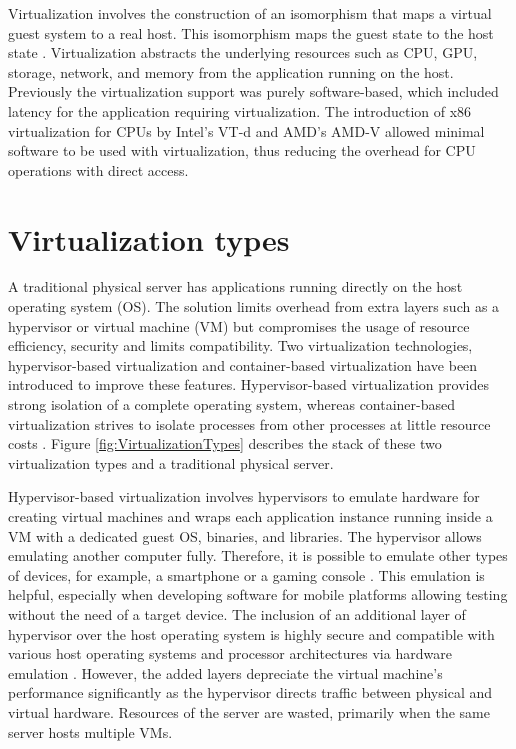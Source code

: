 Virtualization involves the construction of an isomorphism that maps a virtual guest system to a real host. This isomorphism maps the guest state to the host state \cite{Xing2012}. Virtualization abstracts the underlying resources such as CPU, GPU, storage, network, and memory from the application running on the host. Previously the virtualization support was purely software-based, which included latency for the application requiring virtualization. The introduction of x86 virtualization for CPUs by Intel's VT-d and AMD's AMD-V allowed minimal software to be used with virtualization, thus reducing the overhead for CPU operations with direct access.

\section{Virtualization types}

A traditional physical server has applications running directly on the host operating system (OS). The solution limits overhead from extra layers such as a hypervisor or virtual machine (VM) but compromises the usage of resource efficiency, security and limits compatibility. Two virtualization technologies, hypervisor-based virtualization and container-based virtualization have been introduced to improve these features. Hypervisor-based virtualization provides strong isolation of a complete operating system, whereas container-based virtualization strives to isolate processes from other processes at little resource costs \cite{Eder2016}. Figure \ref{fig:VirtualizationTypes} describes the stack of these two virtualization types and a traditional physical server.

Hypervisor-based virtualization involves hypervisors to emulate hardware for creating virtual machines and wraps each application instance running inside a VM with a dedicated guest OS, binaries, and libraries. The hypervisor allows emulating another computer fully. Therefore, it is possible to emulate other types of devices, for example, a smartphone or a gaming console \cite{Eder2016}. This emulation is helpful, especially when developing software for mobile platforms allowing testing without the need of a target device. The inclusion of an additional layer of hypervisor over the host operating system is highly secure and compatible with various host operating systems and processor architectures via hardware emulation \cite{Lingayat2018}. However, the added layers depreciate the virtual machine's performance significantly as the hypervisor directs traffic between physical and virtual hardware. Resources of the server are wasted, primarily when the same server hosts multiple VMs.

